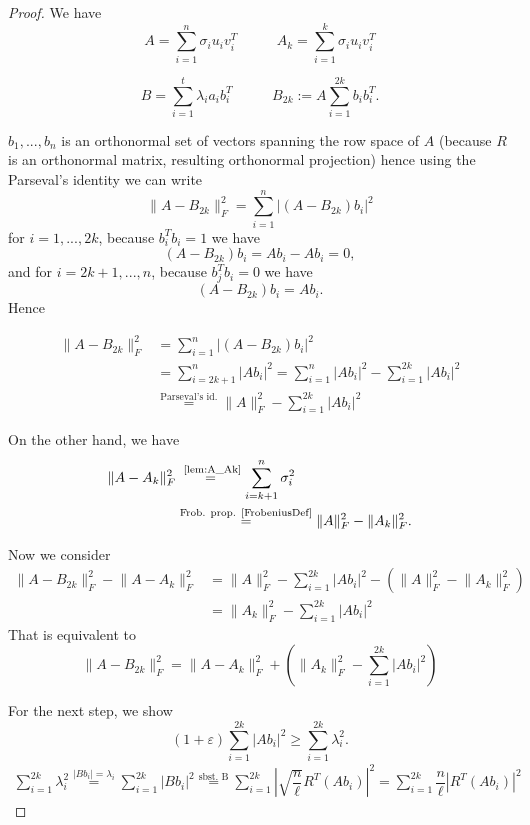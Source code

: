 \documentclass[a4paper,11pt,DIV=15]{scrartcl} %
\renewcommand{\epsilon}{\varepsilon}
\theoremstyle{plain}
\theoremstyle{definition}
\begin{document}
\begin{proof}
We have 
\[
A = \sum_{i=1}^n \sigma_i u_i v_i^T \,\,\,\,\,\,\,\,\,\,\,\,\,\,\,\,\,A_k = \sum_{i=1}^k \sigma_i u_i v_i^T
\]

\[
 B=\sum_{i=1}^t \lambda_i a_i b_i^T\,\,\,\,\,\,\,\,\,\,\,\,\,\,\,\,\, B_{2k} := A \sum_{i=1}^{2k} b_ib_i^T.
\]

$b_1,...,b_n$ is an orthonormal set of vectors spanning the row space of $A$ (because $R$ is an orthonormal matrix, resulting orthonormal projection) hence using the Parseval's identity we can write
\[
 \lVert A - B_{2k} \rVert_F^2 = \sum_{i=1}^n |(A - B_{2k})b_i|^2
\]
for $i = 1,...,2k$, because $b_i^Tb_i = 1$ we have
\[
(A - B_{2k})b_i = Ab_i - Ab_i = 0,
\]
and for  $i = 2k+1,...,n$, because $b_j^Tb_i = 0$ we have
\[
(A - B_{2k})b_i = Ab_i.
\]
Hence

\begin{align*}
    \lVert A - B_{2k} \rVert_F^2 &= \sum_{i=1}^n |(A - B_{2k})b_i|^2\\
    &= \sum_{i=2k+1}^n |A b_i|^2 = \sum_{i=1}^n |A b_i|^2 - \sum_{i=1}^{2k} |A b_i|^2\\
    &\overset{\text{Parseval's id.}}{=} \lVert A \rVert_F^2 - \sum_{i=1}^{2k} |A b_i|^2 
\end{align*}

On the other hand, we have
\begin{align*}
 \lVert A - A_k \rVert_F^2 &\overset{\text{ \cref{lem:A_Ak}}}{=} \sum_{i=k+1}^n \sigma_i^2 \\
 &\overset{\text{Frob. prop. \cite{FrobeniusDef}}}{=}  \lVert A \rVert_F^2 - \lVert A_k \rVert_F^2. 
\end{align*}

Now we consider 
\begin{align*}
   \lVert A - B_{2k} \rVert_F^2 - \lVert A - A_k \rVert_F^2 &= \lVert A \rVert_F^2 - \sum_{i=1}^{2k} |A b_i|^2  - (\lVert A \rVert_F^2 - \lVert A_k \rVert_F^2)\\ 
   &= \lVert A_k \rVert_F^2 - \sum_{i=1}^{2k} |A b_i|^2
\end{align*}
That is equivalent to
\[
\lVert A - B_{2k} \rVert_F^2 = \lVert A - A_k \rVert_F^2 + (\lVert A_k \rVert_F^2 - \sum_{i=1}^{2k} |A b_i|^2)
\]

For the next step, we show
\[
(1+\epsilon) \sum_{i=1}^{2k} |A b_i|^2 \geq \sum_{i=1}^{2k} \lambda_i^2.
\]
\begin{align*}
    \sum_{i=1}^{2k} \lambda_i^2 \overset{|Bb_i| = \lambda_i}{=}\sum_{i=1}^{2k}|Bb_i|^2 
    \overset{\text{sbst. B}}{=} \sum_{i=1}^{2k} | \sqrt{\dfrac{n}{\ell}} R^T (Ab_i)|^2
    = \sum_{i=1}^{2k} \dfrac{n}{\ell}| R^T (Ab_i)|^2
\end{align*}


\end{proof}
\end{document}
